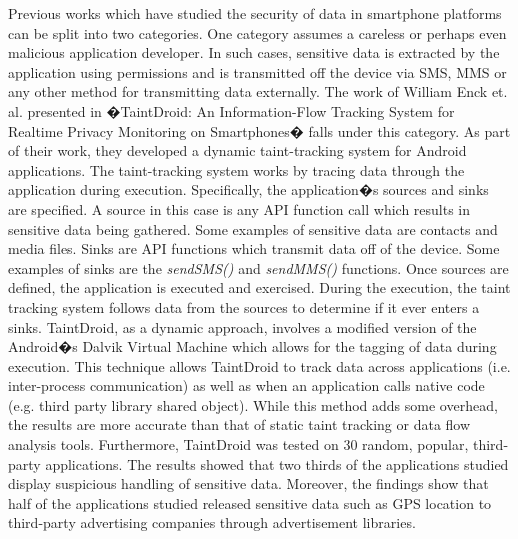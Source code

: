 \documentclass[conference]{IEEEtran}
\begin{document}
Previous works which have studied the security of data in smartphone platforms can be split into two categories.
One category assumes a careless or perhaps even malicious application developer.
In such cases, sensitive data is extracted by the application using permissions and is transmitted off the device via SMS, MMS or any other method for transmitting data externally.
The work of William Enck et. al. presented in �TaintDroid: An Information-Flow Tracking System for Realtime Privacy Monitoring on Smartphones� \cite{enck2014taintdroid} falls under this category.
As part of their work, they developed a dynamic taint-tracking system for Android applications.
The taint-tracking system works by tracing data through the application during execution.
Specifically, the application�s sources and sinks are specified.
A source in this case is any API function call which results in sensitive data being gathered.
Some examples of sensitive data are contacts and media files.
Sinks are API functions which transmit data off of the device.
Some examples of sinks are the \textit{sendSMS()} and \textit{sendMMS()} functions.
Once sources are defined, the application is executed and exercised.
During the execution, the taint tracking system follows data from the sources to determine if it ever enters a sinks.
TaintDroid, as a dynamic approach, involves a modified version of the Android�s Dalvik Virtual Machine which allows for the tagging of data during execution.
This technique allows TaintDroid to track data across applications (i.e. inter-process communication) as well as when an application calls native code (e.g. third party library shared object).
While this method adds some overhead, the results are more accurate than that of static taint tracking or data flow analysis tools.
Furthermore, TaintDroid was tested on 30 random, popular, third-party applications.
The results showed that two thirds of the applications studied display suspicious handling of sensitive data. 
Moreover, the findings show that half of the applications studied released sensitive data such as GPS location to third-party advertising companies through advertisement libraries.
\end{document}
